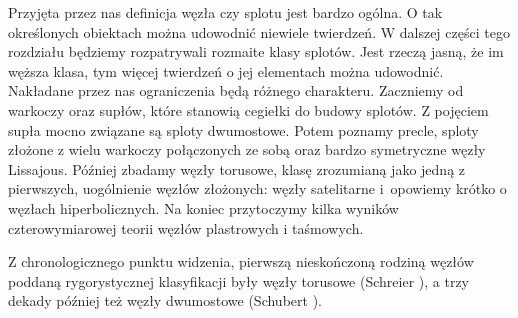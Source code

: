 
Przyjęta przez nas definicja węzła czy splotu jest bardzo ogólna.
O tak określonych obiektach można udowodnić niewiele twierdzeń.
W dalszej części tego rozdziału będziemy rozpatrywali rozmaite klasy splotów.
Jest rzeczą jasną, że im węższa klasa, tym więcej twierdzeń o jej elementach można udowodnić.
Nakładane przez nas ograniczenia będą różnego charakteru.
Zaczniemy od warkoczy oraz supłów, które stanowią cegiełki do budowy splotów.
Z pojęciem supła mocno związane są sploty dwumostowe.
Potem poznamy precle, sploty złożone z wielu warkoczy połączonych ze sobą oraz bardzo symetryczne węzły Lissajous.
Później zbadamy węzły torusowe, klasę zrozumianą jako jedną z pierwszych, uogólnienie węzłów złożonych: węzły satelitarne i~opowiemy krótko o węzłach hiperbolicznych.
Na koniec przytoczymy kilka wyników czterowymiarowej teorii węzłów plastrowych i taśmowych.

Z chronologicznego punktu widzenia, pierwszą nieskończoną rodziną węzłów poddaną rygorystycznej klasyfikacji były węzły torusowe (Schreier \cite{schreier24}), a trzy dekady później też węzły dwumostowe (Schubert \cite{schubert56}).
%
%

